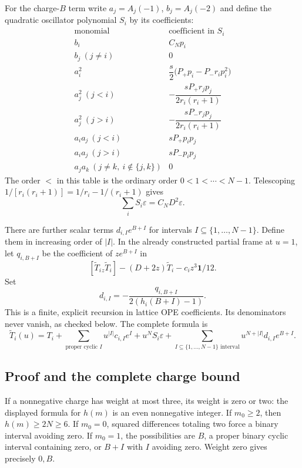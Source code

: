\documentclass[11pt,a4paper]{article}
\numberwithin{equation}{section}
\theoremstyle{definition}\newtheorem{definition}[theorem]{Definition}
\theoremstyle{remark}\newtheorem{remark}[theorem]{Remark}
\newcommand{\one}{\mathbf1}\newcommand{\B}{\mathcal B}\newcommand{\W}{W_N}
\begin{document}
For the charge-$B$ term write $a_j=A_j(-1)$, $b_j=A_j(-2)$ and define the quadratic oscillator polynomial $S_i$ by its coefficients:
\[
\begin{array}{c|c}
\text{monomial}&\text{coefficient in }S_i\\\hline
b_i&C_Np_i\\
b_j\ (j\ne i)&0\\
a_i^2&\dfrac{s}{2}\big(P_+p_i-P_-r_ip_i^2\big)\\[3pt]
a_j^2\ (j<i)&-\dfrac{sP_+r_jp_j}{2r_i(r_i+1)}\\[3pt]
a_j^2\ (j>i)&-\dfrac{sP_-r_jp_j}{2r_i(r_i+1)}\\[3pt]
a_ia_j\ (j<i)&sP_+p_ip_j\\
a_ia_j\ (j>i)&sP_-p_ip_j\\
a_ja_k\ (j\ne k,\ i\notin\{j,k\})&0
\end{array}
\]
The order $<$ in this table is the ordinary order $0<1<\cdots<N-1$. Telescoping $1/[r_i(r_i+1)]=1/r_i-1/(r_i+1)$ gives
\begin{equation}\label{c:screening-total}
 \sum_i S_i\varepsilon=C_ND^2\varepsilon.
\end{equation}

There are further scalar terms $d_{i,I}e^{B+I}$ for intervals $I\subseteq\{1,\ldots,N-1\}$. Define them in increasing order of $|I|$. In the already constructed partial frame at $u=1$, let $q_{i,B+I}$ be the coefficient of $z e^{B+I}$ in
\[
 [\widetilde T_i{}_{z}\widetilde T_i]-(D+2z)\widetilde T_i-c_i z^3\one/12.
\]
Set
\begin{equation}\label{c:screening-tail}
 d_{i,I}=-\frac{q_{i,B+I}}{2(h_i(B+I)-1)}.
\end{equation}
This is a finite, explicit recursion in lattice OPE coefficients. Its denominators never vanish, as checked below. The complete formula is
\begin{equation}\label{c:screening-full}
 \widetilde T_i(u)=T_i+
 \sum_{\text{proper cyclic }I}u^{|I|}c_{i,I}e^I
 +u^NS_i\varepsilon+
 \sum_{I\subseteq\{1,\ldots,N-1\}\text{ interval}}
       u^{N+|I|}d_{i,I}e^{B+I}.
\end{equation}

\subsection*{Proof and the complete charge bound}
If a nonnegative charge has weight at most three, its weight is zero or two: the displayed formula for $h(m)$ is an even nonnegative integer. If $m_0\ge2$, then $h(m)\ge2N\ge6$. If $m_0=0$, squared differences totaling two force a binary interval avoiding zero. If $m_0=1$, the possibilities are $B$, a proper binary cyclic interval containing zero, or $B+I$ with $I$ avoiding zero. Weight zero gives precisely $0,B$.
\end{document}
